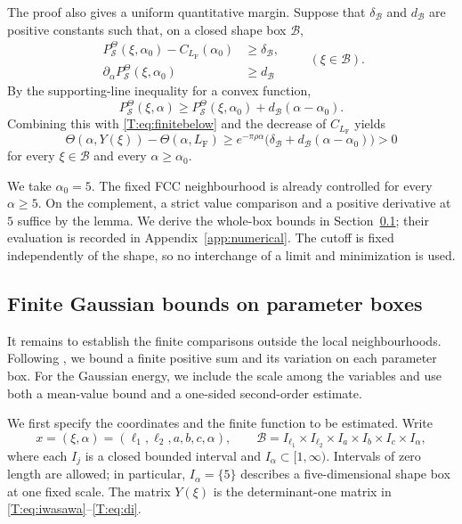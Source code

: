 \documentclass[reqno,english]{amsart}
\theoremstyle{definition}
\newtheorem{open problem}[theorem]{Open Problem}
\theoremstyle{remark}
\theoremstyle{plain}
\numberwithin{equation}{section}
\newcommand{\FCC}{L_{\mathrm F}}
\newcommand{\Th}{\Theta}
\begin{document}
The proof also gives a uniform quantitative margin. Suppose that
$\delta_{\mathcal B}$ and $d_{\mathcal B}$ are positive constants
such that, on a closed shape box $\mathcal B$,
\[
 \begin{aligned}
 P^{\Theta}_{\mathcal S}(\xi,\alpha_0)-C_{\FCC}(\alpha_0)
     &\ge\delta_{\mathcal B},\\
 \partial_\alpha P^{\Theta}_{\mathcal S}(\xi,\alpha_0)
     &\ge d_{\mathcal B}
 \end{aligned}
 \qquad(\xi\in\mathcal B).
\]
By the supporting-line inequality for a convex function,
\[
 P^{\Theta}_{\mathcal S}(\xi,\alpha)
 \ge P^{\Theta}_{\mathcal S}(\xi,\alpha_0)
       +d_{\mathcal B}(\alpha-\alpha_0).
\]
Combining this with \eqref{T:eq:finitebelow} and the decrease of
$C_{\FCC}$ yields
\[
 \Th(\alpha,Y(\xi))-\Th(\alpha,\FCC)
 \ge e^{-\pi\rho\alpha}
      \bigl(\delta_{\mathcal B}
             +d_{\mathcal B}(\alpha-\alpha_0)\bigr)>0
\]
for every $\xi\in\mathcal B$ and every $\alpha\ge\alpha_0$.


We take $\alpha_0=5$. The fixed FCC neighbourhood is already
controlled for every $\alpha\ge5$. On the complement, a strict value
comparison and a positive derivative at $5$ suffice by the lemma.
We derive the whole-box bounds in Section~\ref{T:sec:finite}; their
evaluation is recorded in Appendix~\ref{app:numerical}. The cutoff
is fixed independently of the shape, so no interchange of a limit
and minimization is used.

\subsection{Finite Gaussian bounds on parameter boxes}\label{T:sec:finite}

It remains to establish the finite comparisons outside the local
neighbourhoods. Following \cite[Section~4, pp.~16--17]{SS}, we
bound a finite positive sum and its variation on each parameter box.
For the Gaussian energy, we include the scale among the variables and
use both a mean-value bound and a one-sided second-order estimate.

We first specify the coordinates and the finite function to be
estimated. Write
\[
 x=(\xi,\alpha)=(\ell_1,\ell_2,a,b,c,\alpha),
 \qquad
 \mathcal B=
 I_{\ell_1}\times I_{\ell_2}\times I_a\times I_b\times I_c\times I_\alpha,
\]
where each $I_j$ is a closed bounded interval and
$I_\alpha\subset[1,\infty)$. Intervals of zero length are allowed; in
particular, $I_\alpha=\{5\}$ describes a five-dimensional shape box at
one fixed scale. The matrix $Y(\xi)$ is the determinant-one matrix in
\eqref{T:eq:iwasawa}--\eqref{T:eq:di}.
\end{document}

